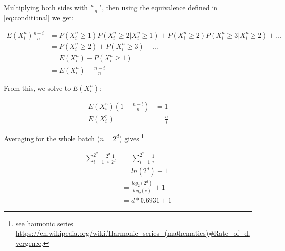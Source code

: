 Multiplying both sides with $\frac{n-i}{n}$, then using  the equivalence defined in  \ref{eq:conditional} we get:

 \begin{subequations}   \begin{align}
\mathit{E}(X^n_i)\frac{n-i}{n}&=\mathit{P}(X^n_i\geq 1)\mathit{P}(X^n_i\geq 2|X^n_i\geq 1)+\mathit{P}(X^n_i\geq 2)\mathit{P}(X^n_i\geq 3|X^n_i\geq 2)+\ldots\\
&=\mathit{P}(X^n_i\geq 2)+\mathit{P}(X^n_i\geq 3)+\ldots\\
&=\mathit{E}(X^n_i)-\mathit{P}(X^n_i\geq 1)\\
&=\mathit{E}(X^n_i)-\frac{n-i}{n}
\end{align} \end{subequations}

From this, we solve to $\mathit{E}(X^n_i)$:

 \begin{subequations}   \begin{align}
\mathit{E}(X^n_i)(1-\frac{n-i}{n})&=1\\
\mathit{E}(X^n_i)&=\frac{n}{i}
\end{align} \end{subequations}

Averaging for the whole batch ($n=2^d$) gives%
%
\footnote{see harmonic series 
\url{https://en.wikipedia.org/wiki/Harmonic\_series\_(mathematics)\#Rate\_of\_divergence}.}

 \begin{subequations}   \begin{align}
\sum_{i=1}^{2^d}\frac{2^d}{i}\frac{1}{2^d}
&=\sum_{i=1}^{2^d}\frac{1}{i}\\
&=\mathit{ln}(2^d)+1\\
&=\frac{\mathit{log}_2(2^d)}{\mathit{log}_2(e)}+1\\
&=d*0.6931+1
\end{align} \end{subequations}



